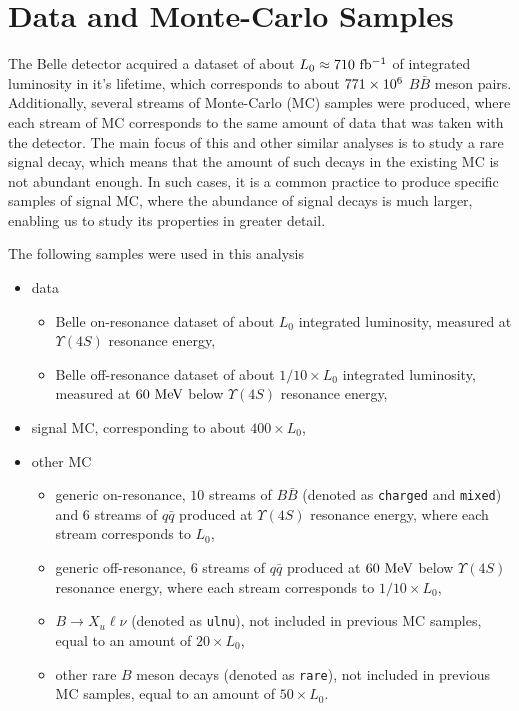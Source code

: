 \chapter{Data and Monte-Carlo Samples}\label{sec:data-and-monte-carlo-samples}

The Belle detector acquired a dataset of about $L_0 \approx 710\mathrm{~fb^{-1}}$ of integrated luminosity in it's lifetime, which corresponds to about $771\times 10^{6}$ $B \bar B$ meson pairs. Additionally, several streams of Monte-Carlo (MC) samples were produced, where each stream of MC corresponds to the same amount of data that was taken with the detector. The main focus of this and other similar analyses is to study a rare signal decay, which means that the amount of such decays in the existing MC is not abundant enough. In such cases, it is a common practice to produce specific samples of signal MC, where the abundance of signal decays is much larger, enabling us to study its properties in greater detail.

The following samples were used in this analysis
\begin{itemize}
	\item data
	\begin{itemize}
		\item Belle on-resonance dataset of about $L_0$ integrated luminosity, measured at $\Upsilon(4S)$ resonance energy,
		\item Belle off-resonance dataset of about $1/10 \times L_0$ integrated luminosity, measured at $60\mathrm{~MeV}$ below $\Upsilon(4S)$ resonance energy,
	\end{itemize}
	\item signal MC, corresponding to about $400 \times L_0$,
	\item other MC
	\begin{itemize}
		\item generic on-resonance, $10$ streams of $B\bar B$ (denoted as \texttt{charged} and \texttt{mixed}) and $6$ streams of $q\bar q$ produced at $\Upsilon(4S)$ resonance energy, where each stream corresponds to $L_0$,
		\item generic off-resonance, $6$ streams of $q\bar q$ produced at $60\mathrm{~MeV}$ below $\Upsilon(4S)$ resonance energy, where each stream corresponds to $1/10 \times L_0$,
		\item $B\to X_u \ell \nu$ (denoted as \texttt{ulnu}), not included in previous MC samples, equal to an amount of $20 \times L_0$, 
		\item other rare $B$ meson decays (denoted as \texttt{rare}), not included in previous MC samples, equal to an amount of $50 \times L_0$.
	\end{itemize}
\end{itemize}

